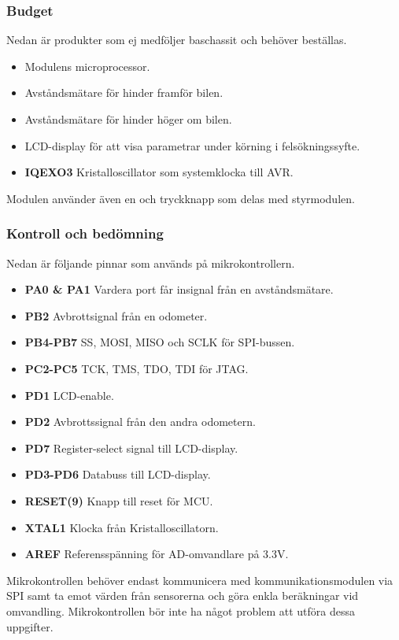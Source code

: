 \documentclass[designspec/spec.tex]{subfiles}
\begin{document}
\subsubsection{Budget}
Nedan är produkter som ej medföljer baschassit och behöver beställas.
\begin{itemize}
	\item \textbf{\modMicrocontroller} Modulens microprocessor. 
    \item \textbf{\modDistf} Avståndsmätare för hinder framför bilen.
    \item \textbf{\modDists} Avståndsmätare för hinder höger om bilen.
    \item \textbf{\modLcd} LCD-display för att visa parametrar under körning
    i felsökningssyfte.
    \item \textbf{IQEXO3} Kristalloscillator som systemklocka till AVR.
\end{itemize}
Modulen använder även en {\modJtag} och tryckknapp som delas med styrmodulen.

\subsubsection{Kontroll och bedömning}
Nedan är följande pinnar som används på mikrokontrollern.
\begin{itemize}
   \item \textbf{PA0 \& PA1} Vardera port får insignal från en avståndsmätare.
   \item \textbf{PB2} Avbrottsignal från en odometer.
   \item \textbf{PB4-PB7} SS, MOSI, MISO och SCLK för SPI-bussen.
   \item \textbf{PC2-PC5} TCK, TMS, TDO, TDI för JTAG.
   \item \textbf{PD1} LCD-enable.
   \item \textbf{PD2} Avbrottssignal från den andra odometern.
   \item \textbf{PD7} Register-select signal till LCD-display.
   \item \textbf{PD3-PD6} Databuss till LCD-display.
   \item \textbf{RESET(9)} Knapp till reset för MCU.
   \item \textbf{XTAL1} Klocka från Kristalloscillatorn. 
   \item \textbf{AREF} Referensspänning för AD-omvandlare på 3.3V.

\end{itemize}
Mikrokontrollen behöver endast kommunicera med kommunikationsmodulen via SPI
samt ta emot värden från sensorerna och göra enkla beräkningar vid omvandling.
Mikrokontrollen bör inte ha något problem att utföra dessa uppgifter.
\end{document}
